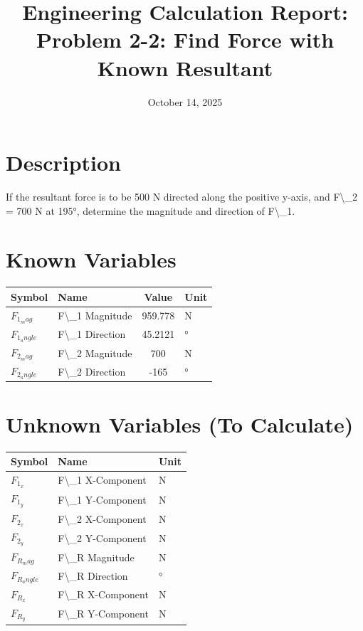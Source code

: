 \documentclass[11pt,a4paper]{article}
\title{Engineering Calculation Report: Problem 2-2: Find Force with Known Resultant}
\date{October 14, 2025}
\begin{document}
\maketitle

\section*{Description}

    If the resultant force is to be 500 N directed along the positive y-axis,
    and F\textbackslash{}_2 = 700 N at 195°, determine the magnitude and direction of F\textbackslash{}_1.
    

\section{Known Variables}

\begin{longtable}{llSl}
\toprule
Symbol & Name & {Value} & Unit \\
\midrule
\endhead
$F_{1_mag}$ & F\textbackslash{}_1 Magnitude & 959.778 & N \\
$F_{1_angle}$ & F\textbackslash{}_1 Direction & 45.2121 & ° \\
$F_{2_mag}$ & F\textbackslash{}_2 Magnitude & 700 & N \\
$F_{2_angle}$ & F\textbackslash{}_2 Direction & -165 & ° \\
\bottomrule
\end{longtable}

\section{Unknown Variables (To Calculate)}

\begin{longtable}{lll}
\toprule
Symbol & Name & Unit \\
\midrule
\endhead
$F_{1_x}$ & F\textbackslash{}_1 X-Component & N \\
$F_{1_y}$ & F\textbackslash{}_1 Y-Component & N \\
$F_{2_x}$ & F\textbackslash{}_2 X-Component & N \\
$F_{2_y}$ & F\textbackslash{}_2 Y-Component & N \\
$F_{R_mag}$ & F\textbackslash{}_R Magnitude & N \\
$F_{R_angle}$ & F\textbackslash{}_R Direction & ° \\
$F_{R_x}$ & F\textbackslash{}_R X-Component & N \\
$F_{R_y}$ & F\textbackslash{}_R Y-Component & N \\
\bottomrule
\end{longtable}
\end{document}
